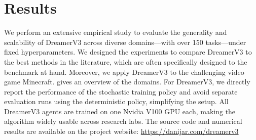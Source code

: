 

\section*{Results}
\label{sec:experiments}

We perform an extensive empirical study to evaluate the generality and scalability of DreamerV3 across diverse domains---with over 150 tasks---under fixed hyperparameters.
We designed the experiments to compare DreamerV3 to the best methods in the literature, which are often specifically designed to the benchmark at hand.
Moreover, we apply DreamerV3 to the challenging video game Minecraft.
 gives an overview of the domains.
For DreamerV3, we directly report the performance of the stochastic training policy and avoid separate evaluation runs using the deterministic policy, simplifying the setup.
All DreamerV3 agents are trained on one Nvidia V100 GPU each, making the algorithm widely usable across research labs.
The source code and numerical results are available on the project website:
\url{https://danijar.com/dreamerv3}

\pagebreak  %

